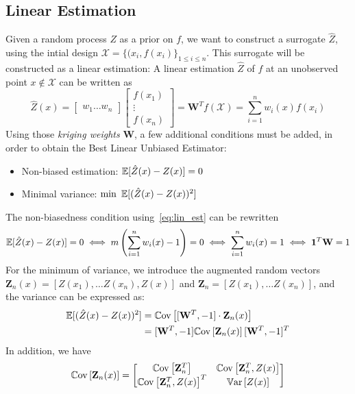 \documentclass[../../Main_ManuscritThese.tex]{subfiles}
\begin{document}
\subsection{Linear Estimation}
\label{sec:linear_estimation}
Given a random process $Z$ as a prior on $f$, we want to construct a surrogate $\hat{Z}$, using the intial design $\mathcal{X} = \{(x_i, f(x_i)\}_{1 \leq i \leq n}$. This surrogate will be constructed as a linear estimation:
A linear estimation $\hat{Z}$ of $f$ at an unobserved point $x\notin \mathcal{X}$ can be written as
\begin{equation}
  \label{eq:lin_est}
  \hat{Z}(x) =
  \begin{bmatrix}
    w_1 \dots w_n
    \end{bmatrix}
    \begin{bmatrix}
      f(x_1) \\ \vdots \\ f(x_n)
    \end{bmatrix} = \mathbf{W}^Tf(\mathcal{X}) = \sum_{i=1}^n w_i(x) f(x_i)
\end{equation}
Using those \emph{kriging weights} $\mathbf{W}$, a few additional conditions must be added, in order to obtain the Best Linear Unbiased Estimator:
\begin{itemize}
\item Non-biased estimation: $\mathbb{E}[\hat{Z}(x) - Z(x)]=0$
\item Minimal variance: $\min~\mathbb{E}[(\hat{Z}(x) - Z(x))^2]$
\end{itemize}
The non-biasedness condition using~\cref{eq:lin_est} can be rewritten
\begin{equation}
  \mathbb{E}[\hat{Z}(x) - Z(x)]=0 \iff m\left(\sum_{i=1}^n w_i(x)-1\right) = 0 \iff \sum_{i=1}^n w_i(x) = 1 \iff \mathbf{1}^T \mathbf{W} = 1
\end{equation}
For the minimum of variance, we introduce the augmented random vectors $\mathbf{Z}_n(x) = [Z(x_1),\dots Z(x_n), Z(x)]$ and $\mathbf{Z}_n = [Z(x_1),\dots Z(x_n)]$, and
the variance can be expressed as:
\begin{align}
  \mathbb{E}[(\hat{Z}(x) - Z(x))^2] &= \mathbb{C}\mathrm{ov}\left[[\mathbf{W}^T, -1] \cdot \mathbf{Z}_n(x) \right] \\
                             &= [\mathbf{W}^T, -1] \mathbb{C}\mathrm{ov}\left[\mathbf{Z}_n(x) \right] [\mathbf{W}^T, -1]^T
\end{align}
In addition, we have
\begin{equation}
  \mathbb{C}\mathrm{ov}\left[\mathbf{Z}_n(x) \right] =
  \begin{bmatrix}
    \mathbb{C}\mathrm{ov}\left[ \mathbf{Z}_n^T\right]
    & \mathbb{C}\mathrm{ov}\left[\mathbf{Z}_n^T, Z(x) \right]
  \\
  \mathbb{C}\mathrm{ov}\left[\mathbf{Z}_n^T, Z(x) \right]^T & \mathbb{V}\mathrm{ar}\left[Z(x)\right]
  \end{bmatrix}
\end{equation}
\end{document}
